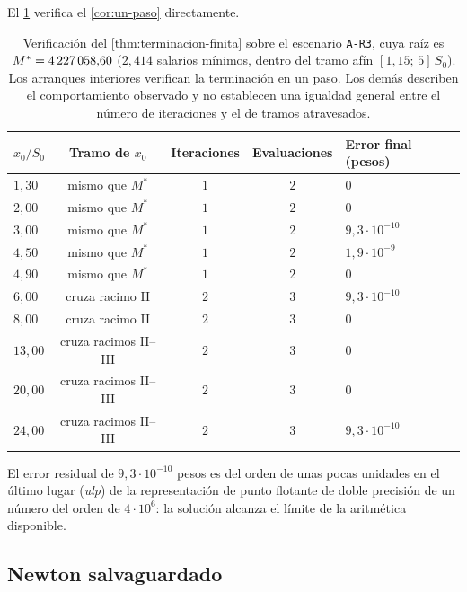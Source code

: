 El \cref{tab:terminacion} verifica el \cref{cor:un-paso} directamente.

\begin{table}[H]
\centering
\caption[Verificación de la terminación finita]{Verificación del
\cref{thm:terminacion-finita} sobre el escenario \texttt{A-R3}, cuya raíz es
$M^*=4\,227\,058{,}60$ ($2{,}414$ salarios mínimos, dentro del tramo afín
$[1{,}15;\,5]\,S_0$). Los arranques interiores verifican la terminación en un
paso. Los demás describen el comportamiento observado y no establecen una
igualdad general entre el número de iteraciones y el de tramos atravesados.}
\label{tab:terminacion}
\small
\begin{tabular}{@{}lccc l@{}}
\toprule
$x_0/S_0$ & Tramo de $x_0$ & Iteraciones & Evaluaciones & Error final (pesos) \\
\midrule
$1{,}30$ & mismo que $M^*$ & $1$ & $2$ & $0$ \\
$2{,}00$ & mismo que $M^*$ & $1$ & $2$ & $0$ \\
$3{,}00$ & mismo que $M^*$ & $1$ & $2$ & $9{,}3\cdot10^{-10}$ \\
$4{,}50$ & mismo que $M^*$ & $1$ & $2$ & $1{,}9\cdot10^{-9}$ \\
$4{,}90$ & mismo que $M^*$ & $1$ & $2$ & $0$ \\
\midrule
$6{,}00$ & cruza racimo II & $2$ & $3$ & $9{,}3\cdot10^{-10}$ \\
$8{,}00$ & cruza racimo II & $2$ & $3$ & $0$ \\
$13{,}00$& cruza racimos II--III & $2$ & $3$ & $0$ \\
$20{,}00$& cruza racimos II--III & $2$ & $3$ & $0$ \\
$24{,}00$& cruza racimos II--III & $2$ & $3$ & $9{,}3\cdot10^{-10}$ \\
\bottomrule
\end{tabular}
\end{table}

El error residual de $9{,}3\cdot10^{-10}$ pesos es del orden de unas pocas unidades
en el último lugar (\emph{ulp}) de la representación de punto flotante de doble precisión
de un número del orden de $4\cdot10^6$: la solución alcanza el límite de la
aritmética disponible.

\subsection{Newton salvaguardado}

